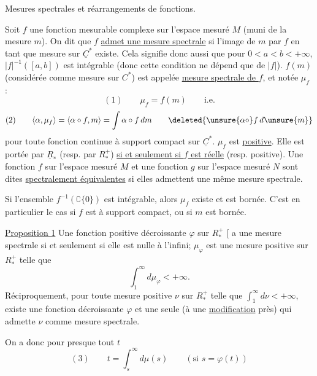 Mesures spectrales et réarrangements de fonctions.


Soit \(f\) une fonction mesurable complexe sur l'espace mesuré \(M\) (muni de la mesure \(m\)). On dit que \(f\) \uline{admet une mesure spectrale} si l'image de \(m\) par \(f\) en tant que mesure sur \(\underline C^*\) existe. Cela signifie donc aussi que pour \(0<a<b<+\infty\), \(|f|^{-1}([a,b])\) est intégrable (donc cette condition ne dépend que de \(|f|\)). \(f(m)\) (considérée comme mesure sur \(C^*\)) est appelée \uline{mesure spectrale de \(f\)}, et notée \(\mu_f\) :
\[
(1)\qquad \mu_f=f(m)\qquad\text{i.e.}
\]
\[
(2)\qquad\langle\alpha,\mu_f\rangle=\langle\alpha\circ f,m\rangle=\int\alpha\circ f\,dm
\qquad\deleted{\unsure{\alpha\circ}f\,d\unsure{m}}
\]
pour toute fonction continue à support compact sur \(\underline C^*\). \(\mu_f\) est \uline{positive}. Elle est portée par \(\underline R_*\) (resp. par \(R_*^+\)) \uline{si et seulement si \(f\) est réelle} (resp. positive).  Une fonction \(f\) sur l'espace mesuré \(M\) et une fonction \(g\) sur l'espace mesuré \(N\) sont dites \uline{spectralement équivalentes} si elles admettent une même mesure spectrale.

 Si l'ensemble \(f^{-1}(\complement\{0\})\) est intégrable, alors \(\mu_f\) existe et est bornée. C'est en particulier le cas si \(f\) est à support compact, ou si \(m\) est bornée.
\inserted{Autre \unsure{cas : toute} \(f\in C_0(M)\), plus \unsure{généralement} telle que, \deleted{\(\unsure{\varepsilon}\)} pour tout \(\varepsilon\), \(|f|^{-1}(]\varepsilon,\infty[)\) est intégrable.}

\uline{Proposition 1}  Une fonction positive décroissante \(\varphi\) sur \(R_*^+\) \(\bigl[\) a une mesure spectrale si et seulement si elle est nulle à l'infini; \(\mu_\varphi\) est une mesure positive sur \(R_*^+\) telle que
\[
\int_1^\infty d\mu_\varphi<+\infty.
\]
Réciproquement, pour toute mesure positive \(\nu\) sur \(R_*^+\) telle que \(\int_1^\infty d\nu<+\infty\), existe une fonction  décroissante \(\varphi\) et une seule (à une \uline{modification}  près) qui admette \(\nu\) comme mesure spectrale.

On a donc pour presque tout \(t\)
\[
(3)\qquad t=\int_s^\infty d\mu(s)\qquad(\text{si }s=\varphi(t))
\]

